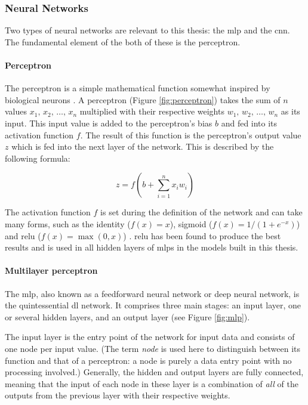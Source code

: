 \subsubsection{Neural Networks}
Two types of neural networks are relevant to this thesis: the \ac{mlp} and the \ac{cnn}. The fundamental element of the both of these is the perceptron.

\paragraph{Perceptron}
The perceptron is a simple mathematical function somewhat inspired by biological neurons \cite{rosenblatt_perceptron_1958}. A perceptron (Figure \ref{fig:perceptron}) takes the sum of \(n\) values \(x_{1},\,x_{2},\,\ldots,\,x_{n}\) multiplied with their respective weights \(w_{1},\,w_{2},\,\ldots,\,w_{n}\) as its input. This input value is added to the perceptron's bias \(b\) and fed into its activation function \(f\). The result of this function is the perceptron's output value \(z\) which is fed into the next layer of the network. This is described by the following formula:

\[
    z = f\left(b + \sum_{i = 1}^{n}x_{i}w_{i}\right)
\]



The activation function \(f\) is set during the definition of the network and can take many forms, such as the identity (\(f\left(x\right) = x\)), sigmoid (\(f\left(x\right) = 1 / \left(1 + e^{-x}\right)\)) and \ac{relu} (\(f\left(x\right) = \max\left(0, x\right)\)) \cite[]{hahnloser_digital_2000}. \ac{relu} has been found to produce the best results \cite[]{jarrett_what_2009} and is used in all hidden layers of \ac{mlp}s in the models built in this thesis.

\paragraph{Multilayer perceptron}
The \ac{mlp}, also known as a feedforward neural network or deep neural network, is the quintessential \ac{dl} network. It comprises three main stages: an input layer, one or several hidden layers, and an output layer (see Figure \ref{fig:mlp}).



The input layer is the entry point of the network for input data and consists of one node per input value. (The term \textit{node} is used here to distinguish between its function and that of a perceptron: a node is purely a data entry point with no processing involved.) Generally, the hidden and output layers are fully connected, meaning that the input of each node in these layer is a combination of \textit{all} of the outputs from the previous layer with their respective weights.

